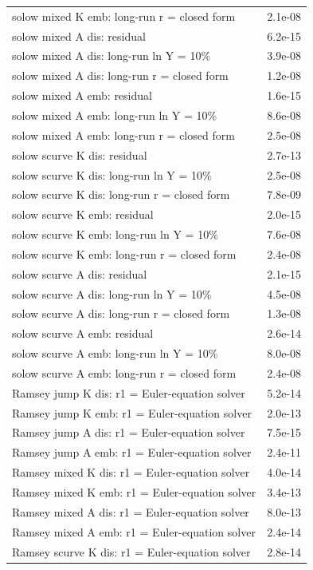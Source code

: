 \begin{tabular}{lc}
solow mixed K emb: long-run r = closed form & 2.1e-08\\
solow mixed A dis: residual & 6.2e-15\\
solow mixed A dis: long-run ln Y = 10\% & 3.9e-08\\
solow mixed A dis: long-run r = closed form & 1.2e-08\\
solow mixed A emb: residual & 1.6e-15\\
solow mixed A emb: long-run ln Y = 10\% & 8.6e-08\\
solow mixed A emb: long-run r = closed form & 2.5e-08\\
solow scurve K dis: residual & 2.7e-13\\
solow scurve K dis: long-run ln Y = 10\% & 2.5e-08\\
solow scurve K dis: long-run r = closed form & 7.8e-09\\
solow scurve K emb: residual & 2.0e-15\\
solow scurve K emb: long-run ln Y = 10\% & 7.6e-08\\
solow scurve K emb: long-run r = closed form & 2.4e-08\\
solow scurve A dis: residual & 2.1e-15\\
solow scurve A dis: long-run ln Y = 10\% & 4.5e-08\\
solow scurve A dis: long-run r = closed form & 1.3e-08\\
solow scurve A emb: residual & 2.6e-14\\
solow scurve A emb: long-run ln Y = 10\% & 8.0e-08\\
solow scurve A emb: long-run r = closed form & 2.4e-08\\
Ramsey jump K dis: r1 = Euler-equation solver & 5.2e-14\\
Ramsey jump K emb: r1 = Euler-equation solver & 2.0e-13\\
Ramsey jump A dis: r1 = Euler-equation solver & 7.5e-15\\
Ramsey jump A emb: r1 = Euler-equation solver & 2.4e-11\\
Ramsey mixed K dis: r1 = Euler-equation solver & 4.0e-14\\
Ramsey mixed K emb: r1 = Euler-equation solver & 3.4e-13\\
Ramsey mixed A dis: r1 = Euler-equation solver & 8.0e-13\\
Ramsey mixed A emb: r1 = Euler-equation solver & 2.4e-14\\
Ramsey scurve K dis: r1 = Euler-equation solver & 2.8e-14\\

\end{tabular}
